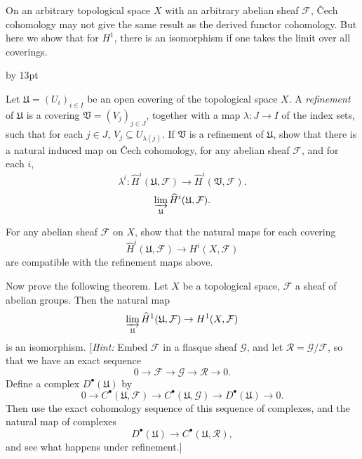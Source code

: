 {{\smallskip
\noindent\hypertarget{ex-III-4.4}{}On an arbitrary topological space $X$ with an arbitrary abelian sheaf $\mathcal F$, \v{C}ech cohomology may not give the same result as the derived functor cohomology. But here we show that for $H^1$, there is an isomorphism if one takes the limit over all coverings.
{\advance\leftskip by 13pt\par
\noindent\hypertarget{ex-III-4.4a}{}Let $\mathfrak U=(U_i)_{i\in I}$ be an open covering of the topological space $X$. A \emph{refinement} of $\mathfrak U$ is a covering $\mathfrak V=(V_j)_{j\in J}$, together with a map $\lambda\colon J\to I$ of the index sets, such that for each $j\in J$, $V_j\subseteq U_{\lambda(j)}$. If $\mathfrak V$ is a refinement of $\mathfrak U$, show that there is a natural induced map on \v{C}ech cohomology, for any abelian sheaf $\mathcal F$, and for each $i$,
\[
\lambda^i\colon\widehat H^i(\mathfrak U,\mathcal F)\to\widehat H^i(\mathfrak V,\mathcal F).
\]
\[
\varinjlim_{\mathfrak U}\widehat H^i(\mathfrak U,\mathcal F).
\]

\noindent\hypertarget{ex-III-4.4b}{}For any abelian sheaf $\mathcal F$ on $X$, show that the natural maps  for each covering
\[
\widehat H^i(\mathfrak U,\mathcal F)\to H^i(X,\mathcal F)
\]
are compatible with the refinement maps above.

\noindent\hypertarget{ex-III-4.4c}{}Now prove the following theorem. Let $X$ be a topological space, $\mathcal F$ a sheaf of abelian groups. Then the natural map
\[
\varinjlim_{\mathfrak U}\widehat H^1(\mathfrak U,\mathcal F)\to H^1(X,\mathcal F)
\]
is an isomorphism. [\emph{Hint:} Embed $\mathcal F$ in a flasque sheaf $\mathcal G$, and let $\mathcal R=\mathcal G/\mathcal F$, so that we have an exact sequence
\[
0\to\mathcal F\to\mathcal G\to\mathcal R\to0.
\]
Define a complex $D^\bullet(\mathfrak U)$ by
\[
0\to C^\bullet(\mathfrak U,\mathcal F)\to C^\bullet(\mathfrak U,\mathcal G)\to D^\bullet(\mathfrak U)\to0.
\]
Then use the exact cohomology sequence of this sequence of complexes, and the natural map of complexes
\[
D^\bullet(\mathfrak U)\to C^\bullet(\mathfrak U,\mathcal R),
\]
and see what happens under refinement.]\par}\par}
}
